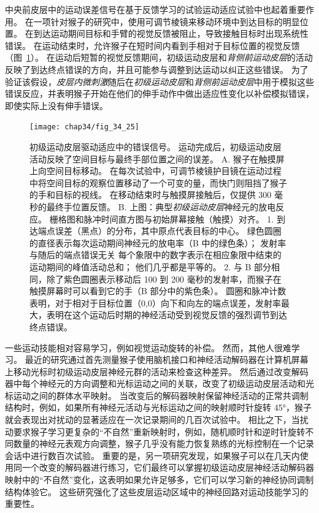 中央前皮层中的运动误差信号在基于反馈学习的试验运动适应试验中也起着重要作用。
在一项针对猴子的研究中，使用可调节棱镜来移动环境中到达目标的明显位置。
在到达运动期间目标和手臂的视觉反馈被阻止，导致接触目标时出现系统性错误。
在运动结束时，允许猴子在短时间内看到手相对于目标位置的视觉反馈（图~\ref{fig:34_25}）。
在运动后短暂的视觉反馈期间，初级运动皮层和\textit{背侧前运动皮层}的活动反映了到达终点错误的方向，并且可能参与调整到达运动以纠正这些错误。
为了验证该假设，\textit{皮层内微刺激}随后在\textit{初级运动皮层}和\textit{背侧前运动皮层}中用于模拟这些错误反应，并表明猴子开始在他们的伸手动作中做出适应性变化以补偿模拟错误，即使实际上没有伸手错误。


\begin{figure}[htbp]
	\centering
	\texttt{[image: chap34/fig\_34\_25]}
	\caption{初级运动皮层驱动适应中的错误信号。
		运动完成后，初级运动皮层活动反映了空间目标与最终手部位置之间的误差\cite{inoue2016error}。
		A. 猴子在触摸屏上向空间目标移动。
		在每次试验中，可调节棱镜护目镜在运动过程中将空间目标的观察位置移动了一个可变的量，而快门则阻挡了猴子的手和目标的视线。
		在移动结束时与触摸屏接触后，仅提供 300 毫秒的最终手位置反馈。
		B. 上图：典型\textit{初级运动皮层}神经元的放电反应。
		栅格图和脉冲时间直方图与初始屏幕接触（触摸）对齐。
		1. 到达端点误差（黑点）的分布，其中原点代表目标的中心。
		绿色圆圈的直径表示每次运动期间神经元的放电率（B 中的绿色条）；
		发射率与随后的端点错误无关
		 每个象限中的数字表示在相应象限中结束的运动期间的峰值活动总和；
		 他们几乎都是平等的。
		 2. 与 B 部分相同，除了紫色圆圈表示移动后 100 到 200 毫秒的发射率，而猴子在触摸屏幕时可以看到它的手（B 部分中的紫色条）。
		 圆圈和脉冲计数表明，对于相对于目标位置（0,0）向下和向左的端点误差，发射率最大，表明在这个运动后时期的神经活动受到视觉反馈的强烈调节到达终点错误。}
	\label{fig:34_25}
\end{figure}


一些运动技能相对容易学习，例如视觉运动旋转的补偿。
然而，其他人很难学习。
最近的研究通过首先测量猴子使用脑机接口和神经活动解码器在计算机屏幕上移动光标时初级运动皮层神经元群的活动来检查这种差异。
然后通过改变解码器中每个神经元的方向调整和光标运动之间的关联，改变了初级运动皮层活动和光标运动之间的群体水平映射。
当改变后的解码器映射保留神经活动的正常共调制结构时，例如，如果所有神经元活动与光标运动之间的映射顺时针旋转 45°，猴子就会表现出对扰动的显著适应在一次记录期间的几百次试验中。
相比之下，当扰动要求猴子学习更复杂的“不自然”重新映射时，例如，随机顺时针和逆时针旋转不同数量的神经元表观方向调整，猴子几乎没有能力恢复熟练的光标控制在一个记录会话中进行数百次试验。
重要的是，另一项研究发现，如果猴子可以在几天内使用同一个改变的解码器进行练习，它们最终可以掌握初级运动皮层神经活动解码器映射中的“不自然”变化，这表明如果允许足够多，它们可以学习新的神经协同调制结构体验它。
这些研究强化了这些皮层运动区域中的神经回路对运动技能学习的重要性。


